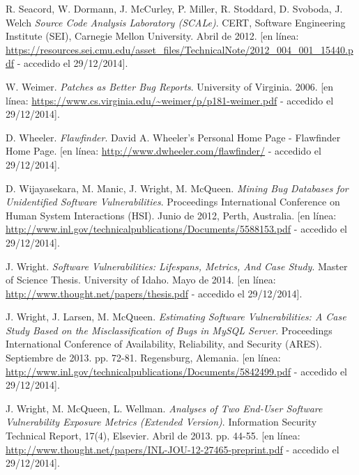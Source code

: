 \documentclass{beamer}
\begin{document}
\begin{thebibliography}{99}
	R. Seacord, W. Dormann, J. McCurley, P. Miller, R. Stoddard, D. Svoboda, J. Welch
	\emph{Source Code Analysis Laboratory (SCALe)}.
	CERT, Software Engineering Institute (SEI), Carnegie Mellon University.
	Abril de 2012.
	[en línea: \url{https://resources.sei.cmu.edu/asset_files/TechnicalNote/2012_004_001_15440.pdf} - accedido el 29/12/2014].
	
	W. Weimer.
	\emph{Patches as Better Bug Reports}.
	University of Virginia. 2006.
	[en línea: \url{https://www.cs.virginia.edu/~weimer/p/p181-weimer.pdf} - accedido el 29/12/2014].
	
	D. Wheeler.
	\emph{Flawfinder}.
	David A. Wheeler’s Personal Home Page - Flawfinder Home Page.
	[en línea: \url{http://www.dwheeler.com/flawfinder/} - accedido el 29/12/2014].
	
	D. Wijayasekara, M. Manic, J. Wright, M. McQueen.
	\emph{Mining Bug Databases for Unidentified Software Vulnerabilities}.
	Proceedings International Conference on Human System Interactions (HSI).
	Junio de 2012, Perth, Australia.
	[en línea: \url{http://www.inl.gov/technicalpublications/Documents/5588153.pdf} - accedido el 29/12/2014].
	
	J. Wright.
	\emph{Software Vulnerabilities: Lifespans, Metrics, And Case Study}.
	Master of Science Thesis. University of Idaho.
	Mayo de 2014.
	[en línea: \url{http://www.thought.net/papers/thesis.pdf} - accedido el 29/12/2014].
	
	J. Wright, J. Larsen, M. McQueen.
	\emph{Estimating Software Vulnerabilities: A Case Study Based on the Misclassification of Bugs in MySQL Server}.
	Proceedings International Conference of Availability, Reliability, and Security (ARES).
	Septiembre de 2013. pp. 72-81. Regensburg, Alemania.
	[en línea: \url{http://www.inl.gov/technicalpublications/Documents/5842499.pdf} - accedido el 29/12/2014].
	
	J. Wright, M. McQueen, L. Wellman.
	\emph{Analyses of Two End-User Software Vulnerability Exposure Metrics (Extended Version)}.
	Information Security Technical Report, 17(4), Elsevier.
	Abril de 2013. pp. 44-55.
	[en línea: \url{http://www.thought.net/papers/INL-JOU-12-27465-preprint.pdf} - accedido el 29/12/2014].
	
	\end{thebibliography}
\end{document}
